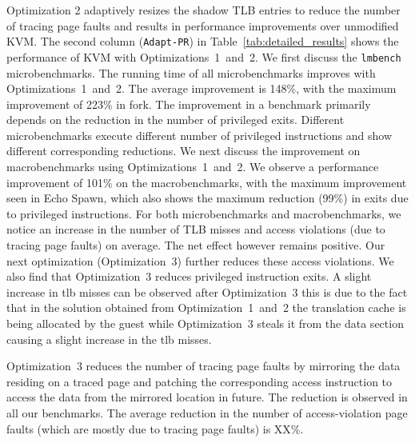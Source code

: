 Optimization 2 adaptively resizes the shadow TLB entries to reduce the number of tracing page faults and results in performance improvements over unmodified KVM. The second column ({\tt Adapt-PR}) in Table~\ref{tab:detailed_results} shows the performance of KVM with Optimizations~1~and~2. We first discuss the {\tt lmbench} microbenchmarks. The running time of all microbenchmarks improves with Optimizations~1~and~2. The average improvement is 148\%, with the maximum improvement of 223\% in fork. The improvement in a benchmark primarily depends on the reduction in the number of privileged exits. Different microbenchmarks execute different number of privileged instructions and show different corresponding reductions. We next discuss the improvement on macrobenchmarks using Optimizations~1~and~2. We observe a performance improvement of 101\% on the macrobenchmarks, with the maximum improvement seen in Echo Spawn, which also shows the maximum reduction (99\%) in exits due to privileged instructions. For both microbenchmarks and macrobenchmarks, we notice an increase in the number of TLB misses and access violations (due to tracing page faults) on average. The net effect however remains positive. Our next optimization (Optimization~3) further reduces these access violations. We also find that Optimization~3 reduces privileged instruction exits. A slight increase in tlb misses can be observed after Optimization~3 this is due to the fact that in the solution obtained from Optimization~1~and~2  the translation cache is being allocated by the guest while Optimization~3 steals it from the data section causing a slight increase in the tlb misses.

Optimization~3 reduces the number of tracing page faults by mirroring the data residing on a traced page and patching the corresponding access instruction to access the data from the mirrored location in future. The reduction is observed in all our benchmarks. The average reduction in the number of access-violation page faults (which are mostly due to tracing page faults) is XX\%.
